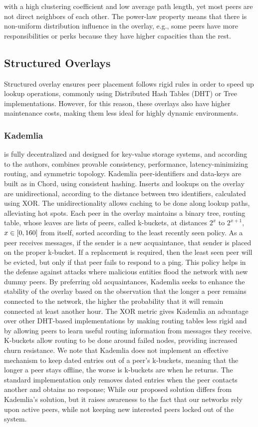 \documentclass[runningheads]{llncs}
\begin{document}
with a high clustering coefficient and low average path length, yet most peers are not direct neighbors of each other. The power-law property means that there is non-uniform distribution influence in the overlay, e.g., some peers have more responsibilities or perks because they have higher capacities than the rest.

\subsection{Structured Overlays}
Structured overlay ensures peer placement follows rigid rules in order to speed up lookup operations, commonly using Distributed Hash Tables (DHT) or Tree implementations. However, for this reason, these overlays also have higher maintenance costs, making them less ideal for highly dynamic environments.

\subsubsection{Kademlia} \cite{kademlia} is fully decentralized and designed for key-value storage systems, and according to the authors, combines provable consistency, performance, latency-minimizing routing, and symmetric topology. Kademlia peer-identifiers and data-keys are built as in Chord\cite{chord}, using consistent hashing. Inserts and lookups on the overlay are unidirectional, according to the distance between two identifiers, calculated using XOR. The unidirectionality allows caching to be done along lookup paths, alleviating hot spots. Each peer in the overlay maintains a binary tree, routing table, whose leaves are lists of peers, called k-buckets, at distances $2^{x}$ to $2^{x+1}$, $x \in\hspace{1mm}\mathclose[0,160\mathclose]$ from itself, sorted according to the least recently seen policy. As a peer receives messages, if the sender is a new acquaintance, that sender is placed on the proper k-bucket. If a replacement is required, then the least seen peer will be evicted, but only if that peer fails to respond to a ping. This policy helps in the defense against attacks where malicious entities flood the network with new dummy peers. By preferring old acquaintances, Kademlia seeks to enhance the stability of the overlay based on the observation that the longer a peer remains connected to the network, the higher the probability that it will remain connected at least another hour\cite{ssaroiu:msp2pfss}. The XOR metric gives Kademlia an advantage over other DHT-based implementations by making routing tables less rigid and by allowing peers to learn useful routing information from messages they receive. K-buckets allow routing to be done around failed nodes, providing increased churn resistance. We note that Kademlia does not implement an effective mechanism to keep dated entries out of a peer's k-buckets, meaning that the longer a peer stays offline, the worse is k-buckets are when he returns. The standard implementation only removes dated entries when the peer contacts another and obtains no response; While our proposed solution differs from Kademlia's solution, but it raises awareness to the fact that our networks rely upon active peers, while not keeping new interested peers locked out of the system.
\end{document}
